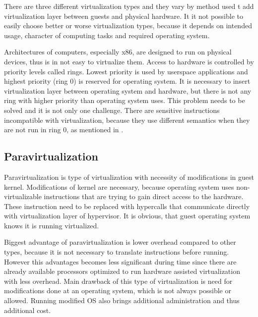 
There are three different virtualization types and they vary by method used t
add virtualization layer between guests and physical hardware. It it not possible to easily choose better or worse virtualization types, because it depends on intended usage, character of computing tasks and required operating system.
 
Architectures of computers, especially x86, are designed to run on physical devices, thus is in not easy to virtualize them. Access to hardware is controlled by priority levels called rings. Lowest priority is used by userspace applications and highest priority (ring 0) is reserved for operating system. It is necessary to insert virtualization layer between operating system and hardware, but there is not any ring with higher priority than operating system uses. This problem needs to be solved and it is not only one challenge. There are sensitive instructions incompatible with virtualization, because they use different semantics when they are not run in ring 0, as mentioned in \cite{vmware-para}.

\subsection{Paravirtualization}
Paravirtualization is type of virtualization with necessity of modifications in guest kernel. Modifications of kernel are necessary, because operating system uses non-virtualizable instructions that are trying to gain direct access to the hardware. These instruction need to be replaced with hypercalls that communicate directly with virtualization layer of hypervisor. \cite{vmware-para} It is obvious, that guest operating system knows it is running virtualized. 

Biggest advantage of paravirtualization is lower overhead compared to other types, because it is not necessary to translate instructions before running. However this advantages becomes less significant during time since there are already available processors optimized to run hardware assisted virtualization with less overhead. Main drawback of this type of virtualization is need for modifications done at an operating system, which is not always possible or allowed. Running modified \Ac{OS} also brings additional administration and thus additional cost.

